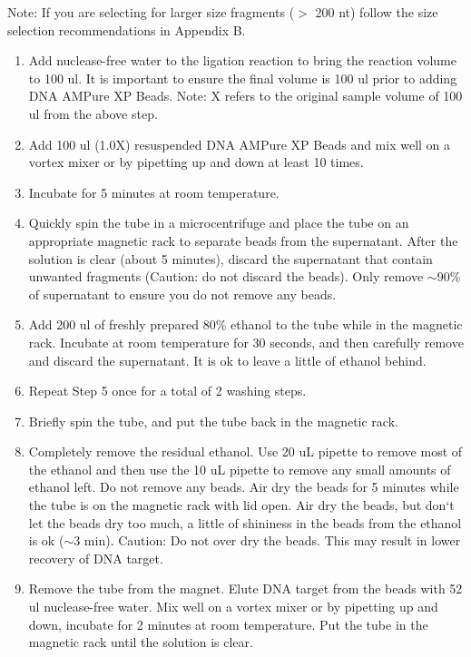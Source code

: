 \documentclass[11pt, oneside]{article}
\begin{document}
		
		\noindent {} Note: If you are selecting for larger size fragments ($>$ 200 nt) follow the size selection 			recommendations in Appendix B. 
		
		\begin{enumerate}
			\item Add nuclease-free water to the ligation reaction to bring the reaction volume to 100 ul. It is important to ensure the final volume is 100 ul 			prior 	to adding DNA AMPure XP Beads. 
			Note: X refers to the original sample volume of 100 ul from the above step. 
			\item Add 100 ul (1.0X) resuspended DNA AMPure XP Beads and mix well on a vortex mixer or by pipetting up and down at least 10 times. 
			\item Incubate for 5 minutes at room temperature. 
			\item Quickly spin the tube in a microcentrifuge and place the tube on an appropriate magnetic rack to separate beads from the supernatant. 			After the solution is clear (about 5 minutes), discard the supernatant that contain unwanted fragments (Caution: do not discard the beads). 			Only remove $\sim$90\% of supernatant to ensure you do not remove any beads.
			\item Add 200 ul of freshly prepared 80\% ethanol to the tube while in the magnetic rack. Incubate at room temperature for 30 seconds, and 			then carefully remove and discard the supernatant. It is ok to leave a little of ethanol behind. 
			\item Repeat Step 5 once for a total of 2 washing steps. 
			\item Briefly spin the tube, and put the tube back in the magnetic rack. 
			\item Completely remove the residual ethanol. Use 20 uL pipette to remove most of the ethanol and then use the 10 uL pipette to remove any 			small amounts of ethanol left. Do not remove any beads. Air dry the beads for 5 minutes while the tube is on the magnetic rack with lid open. 			Air dry the beads, but don`t let the beads dry too much, a little of shininess in the beads from the ethanol is ok ($\sim$3 min).  
			Caution: Do not over dry the beads. This may result in lower recovery of DNA target. 
			\item Remove the tube from the magnet. Elute DNA target from the beads with 52 ul nuclease-free water. Mix well on a vortex mixer or by 			pipetting up and down, incubate for 2 minutes at room temperature. Put the tube in the magnetic rack until the solution is clear. 

\end{enumerate}
\end{document}

